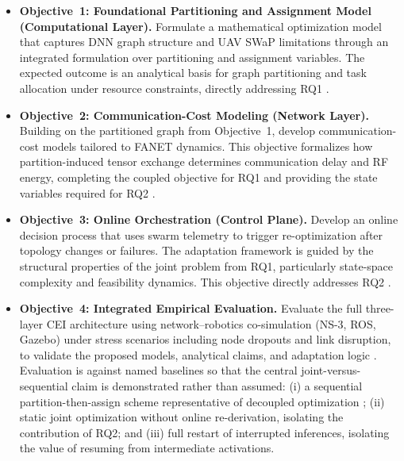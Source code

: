 \begin{itemize}
  \item \textbf{Objective~1: Foundational Partitioning and Assignment Model (Computational Layer).} Formulate a mathematical optimization model that captures DNN graph structure and UAV SWaP limitations through an integrated formulation over partitioning and assignment variables. The expected outcome is an analytical basis for graph partitioning and task allocation under resource constraints, directly addressing RQ1 \cite{hu2025splitreview}.

  \item \textbf{Objective~2: Communication-Cost Modeling (Network Layer).} Building on the partitioned graph from Objective~1, develop communication-cost models tailored to FANET dynamics. This objective formalizes how partition-induced tensor exchange determines communication delay and RF energy, completing the coupled objective for RQ1 and providing the state variables required for RQ2 \cite{lansky2023firefly,hosseinzadeh2024local}.

  \item \textbf{Objective~3: Online Orchestration (Control Plane).} Develop an online decision process that uses swarm telemetry to trigger re-optimization after topology changes or failures. The adaptation framework is guided by the structural properties of the joint problem from RQ1, particularly state-space complexity and feasibility dynamics. This objective directly addresses RQ2 \cite{pan2025selfhealing,jamshidi2025resilient}.

  \item \textbf{Objective~4: Integrated Empirical Evaluation.} Evaluate the full three-layer CEI architecture using network--robotics co-simulation (NS-3, ROS, Gazebo) under stress scenarios including node dropouts and link disruption, to validate the proposed models, analytical claims, and adaptation logic \cite{qu2024elastic,blanquer2024resilient}. Evaluation is against named baselines so that the central joint-versus-sequential claim is demonstrated rather than assumed: (i) a sequential partition-then-assign scheme representative of decoupled optimization \cite{dhuheir2023llhr,kang2017neurosurgeon}; (ii) static joint optimization without online re-derivation, isolating the contribution of RQ2; and (iii) full restart of interrupted inferences, isolating the value of resuming from intermediate activations.
\end{itemize}
